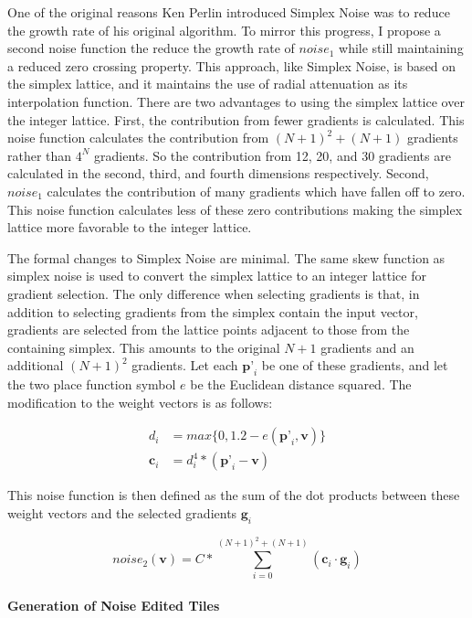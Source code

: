 \documentclass[12pt]{article}
\theoremstyle{definition}
\theoremstyle{remark}
\begin{document}
One of the original reasons Ken Perlin introduced Simplex Noise was to reduce the growth rate of his original algorithm. To mirror this progress, I propose a second noise function the reduce the growth rate of $noise_1$ while still maintaining a reduced zero crossing property. This approach, like Simplex Noise, is based on the simplex lattice, and it maintains the use of radial attenuation as its interpolation function. There are two advantages to using the simplex lattice over the integer lattice. First, the contribution from fewer gradients is calculated. This noise function calculates the contribution from $(N+1)^2+(N+1)$ gradients rather than $4^N$ gradients. So the contribution from 12, 20, and 30 gradients are calculated in the second, third, and fourth dimensions respectively. Second, $noise_1$ calculates the contribution of many gradients which have fallen off to zero. This noise function calculates less of these zero contributions making the simplex lattice more favorable to the integer lattice.

The formal changes to Simplex Noise are minimal. The same skew function as simplex noise is used to convert the simplex lattice to an integer lattice for gradient selection. The only difference when selecting gradients is that, in addition to selecting gradients from the simplex contain the input vector, gradients are selected from the lattice points adjacent to those from the containing simplex. This amounts to the original $N+1$ gradients and an additional $(N+1)^2$ gradients. Let each $\textbf{p'}_i$ be one of these gradients, and let the two place function symbol $e$ be the Euclidean distance squared. The modification to the weight vectors is as follows:

\begin{align*}
d_i &= max\{0, 1.2 - e(\textbf{p'}_i,\textbf{v})\} \\
\textbf{c}_i &= d_i^4 * (\textbf{p'}_i - \textbf{v})
\end{align*}

This noise function is then defined as the sum of the dot products between these weight vectors and the selected gradients $\textbf{g}_i$

\begin{equation*}
noise_2(\textbf{v})=C*\sum_{i=0}^{(N+1)^2+(N+1)}(\textbf{c}_i \cdot \textbf{g}_i)
\end{equation*}

\paragraph{Generation of Noise Edited Tiles}
\end{document}
